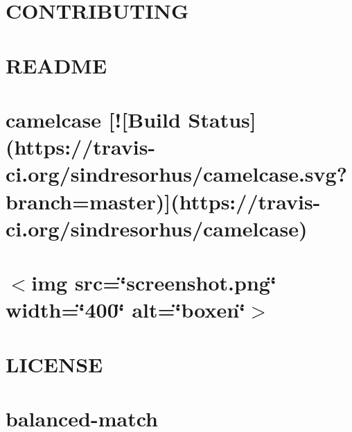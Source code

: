 \documentclass[twoside]{book}
\newcommand{\+}{\discretionary{\mbox{\scriptsize$\hookleftarrow$}}{}{}}
\begin{document}
\chapter{C\+O\+N\+T\+R\+I\+B\+U\+T\+I\+NG}
\label{md__c_1_workspace_demo_src_main_script_node_modules_boom__c_o_n_t_r_i_b_u_t_i_n_g}

\chapter{R\+E\+A\+D\+ME}
\label{md__c_1_workspace_demo_src_main_script_node_modules_boom__r_e_a_d_m_e}

\chapter{camelcase \mbox{[}!\mbox{[}Build Status\mbox{]}(https\+://travis-\/ci.org/sindresorhus/camelcase.svg?branch=master)\mbox{]}(https\+://travis-\/ci.org/sindresorhus/camelcase)}
\label{md__c_1_workspace_demo_src_main_script_node_modules_boxen_node_modules_camelcase_readme}

\chapter{$<$img src=\char`\"{}screenshot.\+png\char`\"{} width=\char`\"{}400\char`\"{} alt=\char`\"{}boxen\char`\"{}$>$}
\label{md__c_1_workspace_demo_src_main_script_node_modules_boxen_readme}

\chapter{L\+I\+C\+E\+N\+SE}
\label{md__c_1_workspace_demo_src_main_script_node_modules_brace-expansion_node_modules_balanced-match__l_i_c_e_n_s_e}

\chapter{balanced-\/match}
\label{md__c_1_workspace_demo_src_main_script_node_modules_brace-expansion_node_modules_balanced-match__r_e_a_d_m_e}

\end{document}

